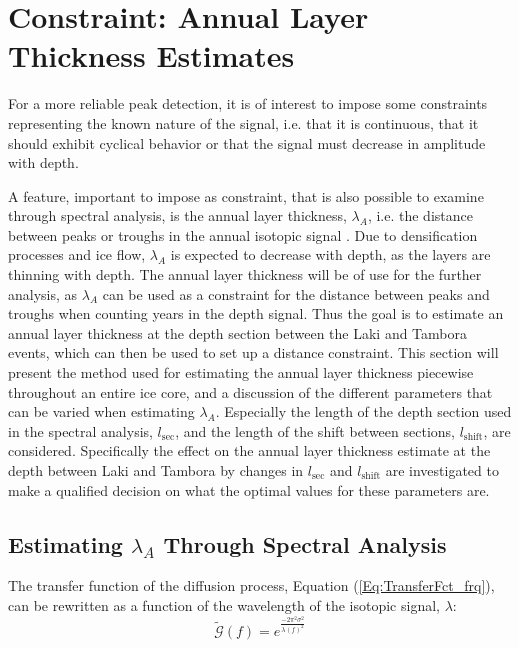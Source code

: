 \documentclass[../../CompleteThesis2/Complete_2ndDraft]{subfiles}
\begin{document}
\section[Constraint: ALT from Spectral Analysis]{Constraint: Annual Layer Thickness Estimates}
\label{Sec:SignalAnalysis_ALT}

For a more reliable peak detection, it is of interest to impose some constraints representing the known nature of the signal, i.e. that it is continuous, that it should exhibit cyclical behavior or that the signal must decrease in amplitude with depth. 

A feature, important to impose as constraint, that is also possible to examine through spectral analysis, is the annual layer thickness, $\lambda_A$, i.e. the distance between peaks or troughs in the annual isotopic signal \cite[B. Vinther et al., 2006]{Vinther2006}. Due to densification processes and ice flow, $\lambda_A$ is expected to decrease with depth, as the layers are thinning with depth. The annual layer thickness will be of use for the further analysis, as $\lambda_A$ can be used as a constraint for the distance between peaks and troughs when counting years in the depth signal. Thus the goal is to estimate an annual layer thickness at the depth section between the Laki and Tambora events, which can then be used to set up a distance constraint. This section will present the method used for estimating the annual layer thickness piecewise throughout an entire ice core, and a discussion of the different parameters that can be varied when estimating $\lambda_A$. Especially the length of the depth section used in the spectral analysis, $l_{\text{sec}}$, and the length of the shift between sections, $l_{\text{shift}}$, are considered. Specifically the effect on the annual layer thickness estimate at the depth between Laki and Tambora by changes in $l_{\text{sec}}$ and $l_{\text{shift}}$ are investigated to make a qualified decision on what the optimal values for these parameters are.

\subsection[Estimating $\lambda_A$]{Estimating $\lambda_A$ Through Spectral Analysis}
The transfer function of the diffusion process, Equation (\ref{Eq:TransferFct_frq}), can be rewritten as a function of the wavelength of the isotopic signal, $\lambda$:
\begin{equation}
	\tilde{\mathcal{G}}(f) = e^{\frac{-2\pi^2\sigma^2}{\lambda(f)^2}}
	\label{Eq:TransferFct_lambda}
\end{equation}
\end{document}
